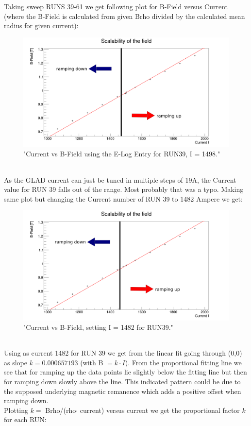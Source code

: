 \documentclass[12pt, letterpaper]{article}
\begin{document}
Taking sweep RUNS 39-61 we get following plot for B-Field versus Current (where the B-Field is calculated from given Brho divided by the calculated mean radius for given current):\\
\begin{figure}[!htbp]
	\centering
	\includegraphics[width=.9\linewidth]{scale_glad.png}
	\caption{"Current vs B-Field using the E-Log Entry for RUN39, I = 1498."}
\end{figure}
\\
As the GLAD current can just be tuned in multiple steps of 19A, the Current value for RUN 39 falls out of the range. Most probably that was a typo. Making same plot but changing the Current number of RUN 39 to 1482 Ampere we get:\\
\begin{figure}[!htbp]
	\centering
	\includegraphics[width=.9\linewidth]{scale_glad_corr.png}
	\caption{"Current vs B-Field, setting I = 1482 for RUN39."}
\end{figure}
\\
Using as current 1482 for RUN 39 we get from the linear fit going through (0,0) as slope $k = 0.000657193$ (with B $= k \cdot I$). From the proportional fitting line we see that for ramping up the data points lie slightly below the fitting line but then for ramping down slowly above the line. This indicated pattern could be due to the  supposed underlying magnetic remanence which adds a positive offset when ramping down. \\
Plotting $k = $ Brho/(rho$\cdot$ current) versus current we get the proportional factor $k$ for each RUN:\\
\end{document}
